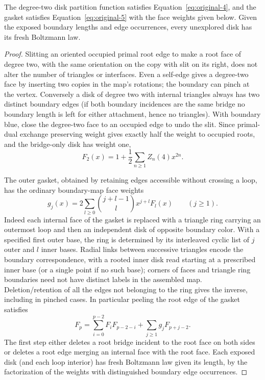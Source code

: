 \begin{lemma}\label{disk:slit-gasket}
The degree-two disk partition function satisfies Equation~\eqref{eq:original-4}, and the gasket satisfies Equation~\eqref{eq:original-5} with the face weights given below.  Given the exposed boundary lengths and edge occurrences, every unexplored disk has its fresh Boltzmann law.
\end{lemma}
\begin{proof}

Slitting an oriented occupied primal root edge to make a root face of degree two, with the same orientation on the copy with slit on its right, does not alter the number of triangles or interfaces.
Even a self-edge gives a degree-two face by inserting two copies in the map's rotations; the boundary can pinch at the vertex.
Conversely a disk of degree two with internal triangles always has two distinct boundary edges (if both boundary incidences are the same bridge no boundary length is left for either attachment, hence no triangles).
With boundary blue, close the degree-two face to an occupied edge to undo the slit.
Since primal-dual exchange preserving weight gives exactly half the weight to occupied roots, and the bridge-only disk has weight one,
\begin{equation}
F_2(x)=1+\frac12\sum_{n\ge1}Z_n(4)x^{2n}.
 \label{eq:original-4}
\end{equation}

The outer gasket, obtained by retaining edges accessible without crossing a loop, has the ordinary boundary-map face weights
\[
 g_j(x)=2\sum_{l\ge0}\binom{j+l-1}{l}x^{j+l}F_l(x)\qquad(j\ge1).
\]
Indeed each internal face of the gasket is replaced with a triangle ring carrying an outermost loop and then an independent disk of opposite boundary color.
With a specified first outer base, the ring is determined by its interleaved cyclic list of \(j\) outer and \(l\) inner bases.
Radial links between successive triangles encode the boundary correspondence, with a rooted inner disk read starting at a prescribed inner base (or a single point if no such base); corners of faces and triangle ring boundaries need not have distinct labels in the assembled map.
Deletion/retention of all the edges not belonging to the ring gives the inverse, including in pinched cases.
In particular peeling the root edge of the gasket satisfies
\begin{equation}
F_p=\sum_{i=0}^{p-2} F_i F_{p-2-i}+\sum_{j\ge1}g_j F_{p+j-2}.
 \label{eq:original-5}
\end{equation}
The first step either deletes a root bridge incident to the root face on both sides or deletes a root edge merging an internal face with the root face.
Each exposed disk (and each loop interior) has fresh Boltzmann law given its length, by the factorization of the weights with distinguished boundary edge occurrences.

\end{proof}

